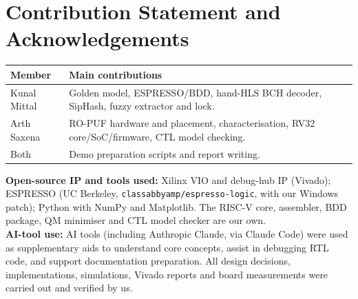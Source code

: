 \documentclass[11pt,a4paper]{article}
\newcommand{\studentA}{Kunal Mittal}            %
\newcommand{\studentB}{Arth Saxena}               %
\begin{document}
\section*{Contribution Statement and Acknowledgements}
\label{sec:contrib}
\begin{table}[H]\centering\small
	\begin{tabularx}{\linewidth}{@{}lX@{}}
		\toprule
		Member & Main contributions\\
		\midrule
		\studentA & Golden model, ESPRESSO/BDD, hand-HLS BCH decoder, SipHash, fuzzy extractor and lock.\\
		\studentB & RO-PUF hardware and placement, characterisation, RV32 core/SoC/firmware, CTL model checking.\\
		Both & Demo preparation scripts and report writing.\\
		\bottomrule
	\end{tabularx}
\end{table}

\textbf{Open-source IP and tools used:} Xilinx VIO and debug-hub IP (Vivado); ESPRESSO (UC Berkeley,
\texttt{classabbyamp/espresso-logic}, with our Windows patch); Python with NumPy and Matplotlib. The RISC-V
core, assembler, BDD package, QM minimiser and CTL model checker are our own.\\
\textbf{AI-tool use:} AI tools (including Anthropic Claude, via Claude Code) were used as supplementary
aids to understand core concepts, assist in debugging RTL code, and support documentation preparation.
All design decisions, implementations, simulations, Vivado reports and board measurements were carried
out and verified by us.
\end{document}
